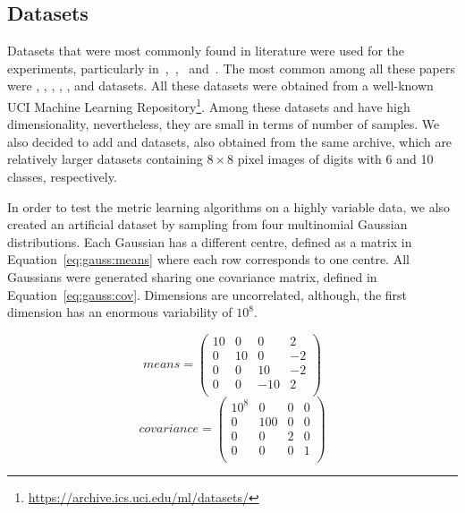 \documentclass[12pt,a4paper]{report}
\begin{document}
\subsection{Datasets} \label{chap:exp:datasets}
Datasets that were most commonly found in literature were used for the experiments, particularly in~\citep{xing2002distance},~\citep{weinberger2009distance},~\citep{jacobgoldberger2004neighbourhood} and~\citep{fukui2013evolutionary}. The most common among all these papers were , , , , ,  and  datasets. All these datasets were obtained from a well-known UCI Machine Learning Repository\footnote{\url{https://archive.ics.uci.edu/ml/datasets/}}. Among these datasets  and  have high dimensionality, nevertheless, they are small in terms of number of samples. We also decided to add  and  datasets, also obtained from the same archive, which are relatively larger datasets containing $8\times 8$ pixel images of digits with 6 and 10 classes, respectively.

In order to test the metric learning algorithms on a highly variable data, we also created an artificial dataset  by sampling from four multinomial Gaussian distributions. Each Gaussian has a different centre, defined as a matrix in Equation~\ref{eq:gauss:means} where each row corresponds to one centre. All Gaussians were generated sharing one covariance matrix, defined in Equation~\ref{eq:gauss:cov}. Dimensions are uncorrelated, although, the first dimension has an enormous variability of $10^8$.

\begin{equation} \label{eq:gauss:means}
means = \begin{pmatrix}
10 & 0 & 0 & 2 \\
0 & 10 & 0 & -2 \\
0 & 0 & 10 & -2 \\
0 & 0 & -10 & 2 \\
\end{pmatrix}
\end{equation}
\begin{equation} \label{eq:gauss:cov}
covariance = \begin{pmatrix}
10^8 & 0 & 0 & 0 \\
0 & 100 & 0 & 0 \\
0 & 0 & 2 & 0 \\
0 & 0 & 0 & 1 \\
\end{pmatrix}
\end{equation}
\end{document}
